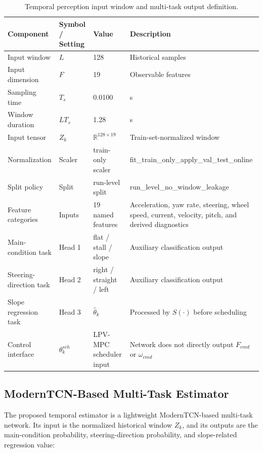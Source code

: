 \documentclass{ieeeaccess}
\begin{document}
\begin{table}[!t]
\centering
\caption{Temporal perception input window and multi-task output definition.}
\label{tab:temporal_input}
\footnotesize
\begin{tabular}{@{}p{}p{}p{}p{}@{}}
\hline
Component & Symbol / Setting & Value & Description \\
\hline
Input window & $L$ & 128 & Historical samples \\
Input dimension & $F$ & 19 & Observable features \\
Sampling time & $T_s$ & 0.0100 & s \\
Window duration & $LT_s$ & 1.28 & s \\
Input tensor & $Z_k$ & $\mathbb{R}^{128\times 19}$ & Train-set-normalized window \\
Normalization & Scaler & train-only scaler & fit\_train\_only\_apply\_val\_test\_online \\
Split policy & Split & run-level split & run\_level\_no\_window\_leakage \\
Feature categories & Inputs & 19 named features & Acceleration, yaw rate, steering, wheel speed, current, velocity, pitch, and derived diagnostics \\
Main-condition task & Head 1 & flat / stall / slope & Auxiliary classification output \\
Steering-direction task & Head 2 & right / straight / left & Auxiliary classification output \\
Slope regression task & Head 3 & $\hat{\theta}_k$ & Processed by $S(\cdot)$ before scheduling \\
Control interface & $\theta_k^{sch}$ & LPV-MPC scheduler input & Network does not directly output $F_{cmd}$ or $\omega_{cmd}$ \\
\hline
\end{tabular}
\end{table}
\FloatBarrier



\subsection{ModernTCN-Based Multi-Task Estimator}



The proposed temporal estimator is a lightweight ModernTCN-based multi-task network. Its input is the normalized historical window $Z_k$, and its outputs are the main-condition probability, steering-direction probability, and slope-related regression value:
\end{document}
